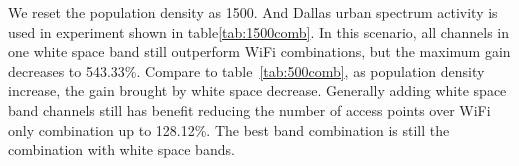 We reset the population density as 1500. And Dallas urban spectrum activity is 
used in experiment shown in table\ref{tab:1500comb}.
In this scenario, all channels in one white space band still outperform WiFi 
combinations, but the maximum gain decreases to 543.33\%.
Compare to table~\ref{tab:500comb}, as population density increase, the gain brought by white space decrease. 
Generally adding white space band channels still has benefit reducing the number of access points
over WiFi only combination up to 128.12\%. 
The best
band combination is still the combination with white space bands. 

